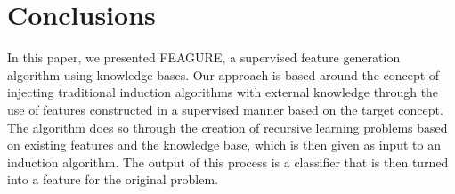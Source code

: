 \documentclass[twoside,11pt]{article}
\theoremstyle{definition}
\begin{document}

 




\section{Conclusions}

In this paper, we presented FEAGURE, a supervised feature generation algorithm using knowledge bases. Our approach is based around the concept of injecting traditional induction algorithms with external knowledge through the use of features constructed in a supervised manner based on the target concept. 
The algorithm does so through the creation of recursive learning problems based on existing features and the knowledge base, which is then given as input to an induction algorithm. The output of this process is a classifier that is then turned into a feature for the original problem.
\end{document}
